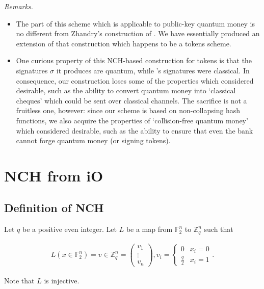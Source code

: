 \documentclass{article}
\begin{document}
\noindent \textit{Remarks.}
\begin{itemize}
    \item The part of this scheme which is applicable to public-key quantum money is no different from Zhandry's construction of \cite{zha17}. We have essentially produced an extension of that construction which happens to be a tokens scheme.
    \item One curious property of this NCH-based construction for tokens is that the signatures $\sigma$ it produces are quantum, while \cite{tokens}'s signatures were classical. In consequence, our construction loses some of the properties which \cite{tokens} considered desirable, such as the ability to convert quantum money into `classical cheques' which could be sent over classical channels. The sacrifice is not a fruitless one, however: since our scheme is based on non-collapsing hash functions, we also acquire the properties of `collision-free quantum money' which \cite{zha17} considered desirable, such as the ability to ensure that even the bank cannot forge quantum money (or signing tokens).
\end{itemize}

\section{NCH from iO}

\subsection{Definition of NCH}

Let $q$ be a positive even integer. Let $L$ be a map from $\mathbb{F}_2^n$ to $\mathbb{Z}_q^n$ such that

\begin{align}
	L(x \in \mathbb{F}_2^n) = v \in \mathbb{Z}_q^n = \begin{pmatrix} v_1 \\ \vdots \\ v_n \end{pmatrix},
	v_i =
	\begin{cases}
		0 & x_i = 0 \\
		\frac{q}{2} & x_i = 1
	\end{cases}.
\end{align}

Note that $L$ is injective.
\end{document}
